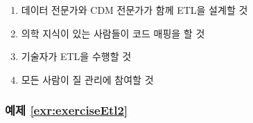 \documentclass[10.5pt]{book}
\providecommand{\tightlist}{%
  \setlength{\itemsep}{0pt}\setlength{\parskip}{0pt}}
\theoremstyle{definition}
\theoremstyle{definition}
\theoremstyle{definition}
\theoremstyle{remark}
\begin{document}
\begin{enumerate}
\def\labelenumi{\Alph{enumi})}
\tightlist
\item
  데이터 전문가와 CDM 전문가가 함께 ETL을 설계할 것
\item
  의학 지식이 있는 사람들이 코드 매핑을 할 것
\item
  기술자가 ETL을 수행할 것
\item
  모든 사람이 질 관리에 참여할 것
\end{enumerate}

\subsubsection*{예제 \ref{exr:exerciseEtl2}}\label{-refexrexerciseetl2}
\end{document}
